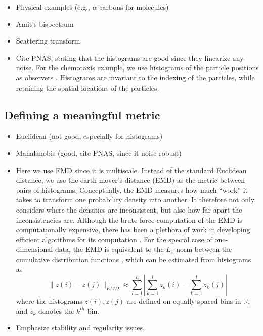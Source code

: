 \documentclass[preprint]{elsarticle}
\begin{document}
\begin{itemize}
\item Physical examples (e.g., $\alpha$-carbons for molecules)
\item Amit's bispectrum
\item Scattering transform
\item Cite PNAS, stating that the histograms are good since they linearize any noise. 
For the chemotaxis example, we use histograms of the particle positions as observers \cite{talmon2013empirical}. 
%
Histograms are invariant to the indexing of the particles, while retaining the spatial locations of the particles.
\end{itemize}

\subsection{Defining a meaningful metric}

\begin{itemize}
\item Euclidean (not good, especially for histograms)
\item Mahalanobis (good, cite PNAS, since it noise robust)
\item Here we use EMD since it is multiscale.
%
Instead of the standard Euclidean distance, we use the earth mover's distance (EMD) \cite{rubner2000earth} as the metric between pairs of histograms. 
%
Conceptually, the EMD measures how much ``work'' it takes to transform one probability density into another.
%
It therefore not only considers where the densities are inconsistent, but also how far apart the inconsistencies are.
%
Although the brute-force computation of the EMD is computationally expensive, there has been a plethora of work in developing efficient algorithms for its computation \cite{Pele-eccv2008, Pele-iccv2009}.
%
For the special case of one-dimensional data, the EMD is equivalent to the $L_1$-norm between the cumulative distribution functions \cite{rubner2000perceptual}, which can be estimated from histograms as
\begin{equation}
\| z(i) - z(j) \|_{EMD} \approx \sum_{l=1}^{n} \left| \sum_{k=1}^l z_k(i) - \sum_{k=1}^l z_k(j) \right|
\end{equation}
where the histograms $z(i), z(j)$ are defined on equally-spaced bins in $\mathbb{R}$, and $z_k$ denotes the $k^{th}$ bin. 
%
\item Emphasize stability and regularity issues.
\end{itemize}
\end{document}
